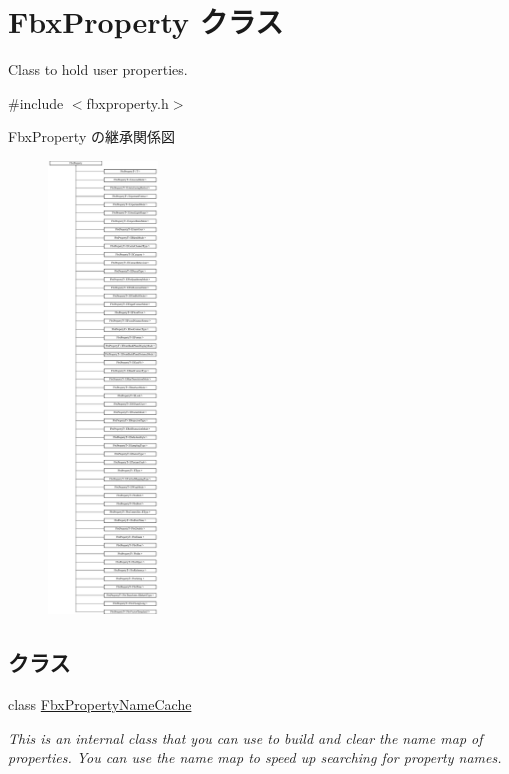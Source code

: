 \hypertarget{class_fbx_property}{}\section{Fbx\+Property クラス}
\label{class_fbx_property}


Class to hold user properties.  




{\ttfamily \#include $<$fbxproperty.\+h$>$}

Fbx\+Property の継承関係図\begin{figure}[H]
\begin{center}
\leavevmode
\includegraphics[height=12.000000cm]{class_fbx_property}
\end{center}
\end{figure}
\subsection*{クラス}
\begin{DoxyCompactItemize}
\item 
class \hyperlink{class_fbx_property_1_1_fbx_property_name_cache}{Fbx\+Property\+Name\+Cache}
\begin{DoxyCompactList}\small\item\em This is an internal class that you can use to build and clear the name map of properties. You can use the name map to speed up searching for property names. \end{DoxyCompactList}\end{DoxyCompactItemize}
